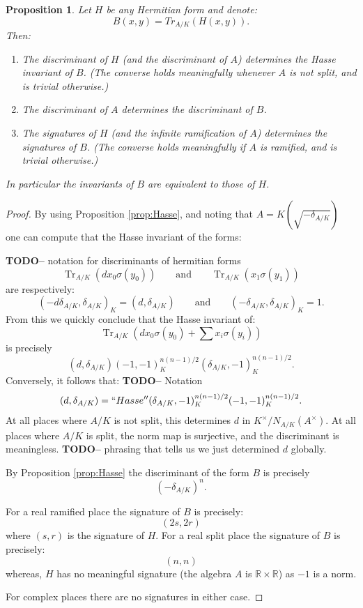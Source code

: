 \documentclass{article}
\theoremstyle{plain}
\newtheorem{proposition}[theorem]{Proposition}
\theoremstyle{definition}
\DeclareMathOperator{\Tr}{Tr}
\newcommand{\RR}{\mathbb{R}}
\newcommand{\TODO}[1]{\textbf{TODO-#1}}
\begin{document}
\begin{proposition}\label{prop:InvariantRelations}
Let $H$ be any Hermitian form and denote:
\[ B(x,y) = Tr_{A/K}(H(x,y)). \]
Then:
\begin{enumerate}
\item The discriminant of $H$ (and the discriminant of $A$) determines the Hasse invariant of $B$. (The converse holds meaningfully whenever $A$ is not split, and is trivial otherwise.)
\item The discriminant of $A$ determines the discriminant of $B$.
\item The signatures of $H$ (and the infinite ramification of $A$) determines the signatures of $B$. (The converse holds meaningfully if $A$ is ramified, and is trivial otherwise.)
\end{enumerate}
In particular the invariants of $B$ are equivalent to those of $H$.
\end{proposition}
\begin{proof}
By using Proposition \ref{prop:Hasse}, and noting that $A = K(\sqrt{-\delta_{A/K}})$ one can compute that the Hasse invariant of the forms:

\TODO - notation for discriminants of hermitian forms
\[\Tr_{A/K}(dx_0\sigma(y_0)) \qquad \text{and} \qquad \Tr_{A/K}(x_1\sigma(y_1)) \]
are respectively:
\[ (-d \delta_{A/K}, \delta_{A/K})_K = (d,\delta_{A/K}) \qquad \text{and}\qquad ( -\delta_{A/K}, \delta_{A/K})_K = 1. \]
From this we quickly conclude that the Hasse invariant of:
\[ \Tr_{A/K}\left(dx_0\sigma(y_0) + \sum x_i\sigma(y_i)\right) \]
is precisely
\[ (d,\delta_{A/K})(-1,-1)_K^{n(n-1)/2}(\delta_{A/K},-1)_K^{n(n-1)/2}.\]
Conversely, it follows that:
\TODO - Notation
\[ (d,\delta_{A/K}) = ``Hasse''  (\delta_{A/K},-1)_K^{n(n-1)/2}(-1,-1)_K^{n(n-1)/2}. \]
At all places where $A/K$ is not split, this determines $d$ in $K^\times/N_{A/K}(A^\times)$.
At all places where $A/K$ is split, the norm map is surjective, and the discriminant is meaningless.
\TODO - phrasing that tells us we just determined $d$ globally.


By Proposition \ref{prop:Hasse} the discriminant of the form $B$ is precisely
\[ (-\delta_{A/K})^n. \]

For a real ramified place the signature of $B$ is precisely:
\[ (2s,2r) \]
where $(s,r)$ is the signature of $H$.
For a real split place the signature of $B$ is precisely:
\[ (n,n) \]
whereas, $H$ has no meaningful signature (the algebra $A$ is $\RR\times \RR$) as $-1$ is a norm.

For complex places there are no signatures in either case.
\end{proof}
\end{document}
